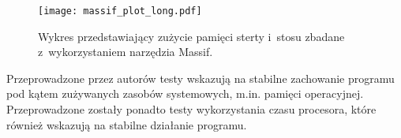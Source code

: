 \begin{figure}[H]
    \centering
    \texttt{[image: massif\_plot\_long.pdf]}
    \caption{Wykres przedstawiający zużycie pamięci sterty i~stosu zbadane z~wykorzystaniem narzędzia Massif.}
    \label{fig:massif-long}
\end{figure}

Przeprowadzone przez autorów testy wskazują na stabilne zachowanie programu pod kątem zużywanych zasobów systemowych, m.in. pamięci operacyjnej. Przeprowadzone zostały ponadto testy wykorzystania czasu procesora, które również wskazują na stabilne działanie programu.
